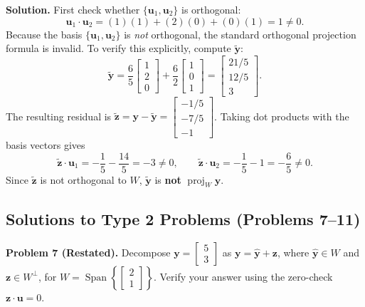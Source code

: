 \documentclass[11pt, letterpaper]{article}
\theoremstyle{definition}
\theoremstyle{remark}
\begin{document}
\textbf{Solution.}
First check whether $\{\mathbf{u}_1, \mathbf{u}_2\}$ is orthogonal:
\[
\mathbf{u}_1 \cdot \mathbf{u}_2 = (1)(1) + (2)(0) + (0)(1) = 1 \neq 0.
\]
Because the basis $\{\mathbf{u}_1, \mathbf{u}_2\}$ is \emph{not} orthogonal, the standard orthogonal projection formula is invalid. To verify this explicitly, compute $\tilde{\mathbf{y}}$:
\[
\tilde{\mathbf{y}} = \frac{6}{5}\begin{bmatrix} 1 \\ 2 \\ 0 \end{bmatrix} + \frac{6}{2}\begin{bmatrix} 1 \\ 0 \\ 1 \end{bmatrix} = \begin{bmatrix} 21/5 \\ 12/5 \\ 3 \end{bmatrix}.
\]
The resulting residual is $\tilde{\mathbf{z}} = \mathbf{y} - \tilde{\mathbf{y}} = \begin{bmatrix} -1/5 \\ -7/5 \\ -1 \end{bmatrix}$. Taking dot products with the basis vectors gives
\[
\tilde{\mathbf{z}} \cdot \mathbf{u}_1 = -\frac{1}{5} - \frac{14}{5} = -3 \neq 0, \qquad \tilde{\mathbf{z}} \cdot \mathbf{u}_2 = -\frac{1}{5} - 1 = -\frac{6}{5} \neq 0.
\]
Since $\tilde{\mathbf{z}}$ is not orthogonal to $W$, $\tilde{\mathbf{y}}$ is \textbf{not} $\operatorname{proj}_W \mathbf{y}$.

\subsection{Solutions to Type 2 Problems (Problems 7--11)}

\textbf{Problem 7 (Restated).} Decompose $\mathbf{y} = \begin{bmatrix} 5 \\ 3 \end{bmatrix}$ as $\mathbf{y} = \hat{\mathbf{y}} + \mathbf{z}$, where $\hat{\mathbf{y}} \in W$ and $\mathbf{z} \in W^\perp$, for $W = \operatorname{Span}\left\{\begin{bmatrix} 2 \\ 1 \end{bmatrix}\right\}$. Verify your answer using the zero-check $\mathbf{z} \cdot \mathbf{u} = 0$.
\end{document}
